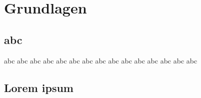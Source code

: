
\chapter{Grundlagen}
\section{abc}
abc abc abc
abc abc abc
abc abc abc
abc abc abc
abc abc abc

\section{Lorem ipsum}

\begin{figure}
\centering
{}
\end{figure}

\lipsum


